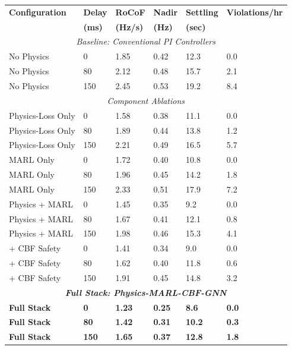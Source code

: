 \documentclass[12pt]{article}
\begin{document}
\begin{center}
\footnotesize
\begin{tabular}{|p{2.0cm}|p{1.0cm}|p{1.2cm}|p{1.2cm}|p{1.2cm}|p{1.5cm}|}
\hline
\textbf{Configuration} & \textbf{Delay} & \textbf{RoCoF} & \textbf{Nadir} & \textbf{Settling} & \textbf{Violations/hr} \\
 & \textbf{(ms)} & \textbf{(Hz/s)} & \textbf{(Hz)} & \textbf{(sec)} & \\
\hline
\multicolumn{6}{|c|}{\textit{Baseline: Conventional PI Controllers}} \\
\hline
No Physics & 0 & 1.85 & 0.42 & 12.3 & 0.0 \\
No Physics & 80 & 2.12 & 0.48 & 15.7 & 2.1 \\
No Physics & 150 & 2.45 & 0.53 & 19.2 & 8.4 \\
\hline
\multicolumn{6}{|c|}{\textit{Component Ablations}} \\
\hline
Physics-Loss Only & 0 & 1.58 & 0.38 & 11.1 & 0.0 \\
Physics-Loss Only & 80 & 1.89 & 0.44 & 13.8 & 1.2 \\
Physics-Loss Only & 150 & 2.21 & 0.49 & 16.5 & 5.7 \\
\hline
MARL Only & 0 & 1.72 & 0.40 & 10.8 & 0.0 \\
MARL Only & 80 & 1.96 & 0.45 & 14.2 & 1.8 \\
MARL Only & 150 & 2.33 & 0.51 & 17.9 & 7.2 \\
\hline
Physics + MARL & 0 & 1.45 & 0.35 & 9.2 & 0.0 \\
Physics + MARL & 80 & 1.67 & 0.41 & 12.1 & 0.8 \\
Physics + MARL & 150 & 1.98 & 0.46 & 15.3 & 4.1 \\
\hline
+ CBF Safety & 0 & 1.41 & 0.34 & 9.0 & 0.0 \\
+ CBF Safety & 80 & 1.62 & 0.40 & 11.8 & 0.6 \\
+ CBF Safety & 150 & 1.91 & 0.45 & 14.8 & 3.2 \\
\hline
\multicolumn{6}{|c|}{\textit{\textbf{Full Stack: Physics-MARL-CBF-GNN}}} \\
\hline
\textbf{Full Stack} & \textbf{0} & \textbf{1.23} & \textbf{0.25} & \textbf{8.6} & \textbf{0.0} \\
\textbf{Full Stack} & \textbf{80} & \textbf{1.42} & \textbf{0.31} & \textbf{10.2} & \textbf{0.3} \\
\textbf{Full Stack} & \textbf{150} & \textbf{1.65} & \textbf{0.37} & \textbf{12.8} & \textbf{1.8} \\
\hline
\end{tabular}
\end{center}
\end{document}
